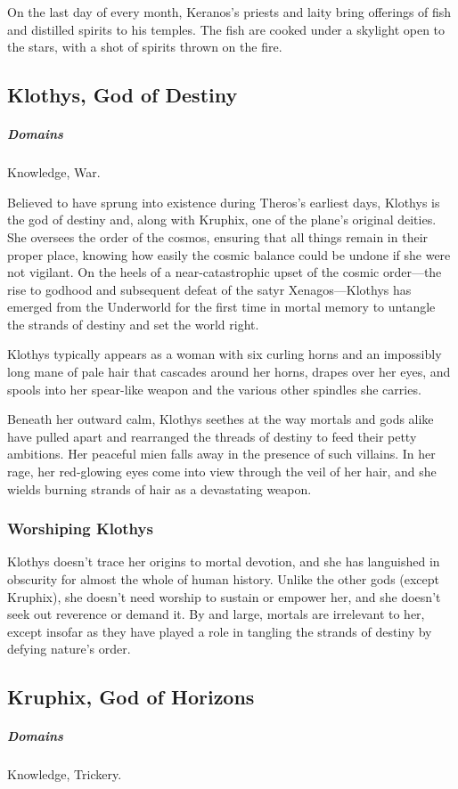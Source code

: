         On the last day of every month, Keranos's priests and laity bring offerings of fish and distilled spirits to his temples. The fish are cooked under a skylight open to the stars, with a shot of spirits thrown on the fire.

\subsection*{Klothys, God of Destiny} \label{ssec::klothys}
    \subparagraph{Domains} Knowledge, War.

    Believed to have sprung into existence during Theros's earliest days, Klothys is the god of destiny and, along with Kruphix, one of the plane's original deities. She oversees the order of the cosmos, ensuring that all things remain in their proper place, knowing how easily the cosmic balance could be undone if she were not vigilant. On the heels of a near-catastrophic upset of the cosmic order—the rise to godhood and subsequent defeat of the satyr Xenagos—Klothys has emerged from the Underworld for the first time in mortal memory to untangle the strands of destiny and set the world right.

    Klothys typically appears as a woman with six curling horns and an impossibly long mane of pale hair that cascades around her horns, drapes over her eyes, and spools into her spear-like weapon and the various other spindles she carries.

    Beneath her outward calm, Klothys seethes at the way mortals and gods alike have pulled apart and rearranged the threads of destiny to feed their petty ambitions. Her peaceful mien falls away in the presence of such villains. In her rage, her red-glowing eyes come into view through the veil of her hair, and she wields burning strands of hair as a devastating weapon.

    \subsubsection{Worshiping Klothys}
        Klothys doesn't trace her origins to mortal devotion, and she has languished in obscurity for almost the whole of human history. Unlike the other gods (except Kruphix), she doesn't need worship to sustain or empower her, and she doesn't seek out reverence or demand it. By and large, mortals are irrelevant to her, except insofar as they have played a role in tangling the strands of destiny by defying nature's order.

\subsection*{Kruphix, God of Horizons} \label{ssec::kruphix}
    \subparagraph{Domains} Knowledge, Trickery.

